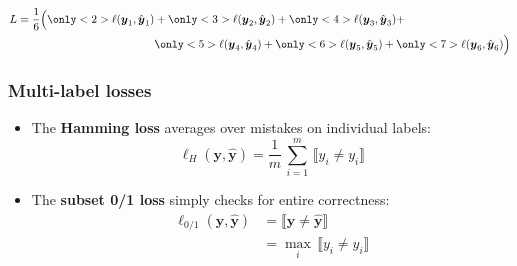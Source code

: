\documentclass[]{beamer}
\renewcommand{\vec}[1]{\boldsymbol{#1}}
\newcommand{\ellrank}{\ell_{\textnormal{\scriptsize{rnk}}}}
\newcommand{\by}{\boldsymbol{y}}
\newcommand{\bh}{\boldsymbol{h}}
\newcommand{\assert}[1]{\llbracket #1 \rrbracket}
\renewcommand{\emph}[1]{\textbf{\color{putblue}#1}}
\begin{document}
\begin{frame}
\begin{align*}
L = \frac{1}{6} \Big( {\only<2>{\color{putred}}\ell(\vec{y}_1,\hat{\vec{y}}_1)}  & + 
{\only<3>{\color{putred}}\ell(\vec{y}_2,\hat{\vec{y}}_2)} +
{\only<4>{\color{putred}}\ell(\vec{y}_3,\hat{\vec{y}}_3)} + \\
& {\only<5>{\color{putred}}\ell(\vec{y}_4,\hat{\vec{y}}_4)} +
{\only<6>{\color{putred}}\ell(\vec{y}_5,\hat{\vec{y}}_5)} +
{\only<7>{\color{putred}}\ell(\vec{y}_6,\hat{\vec{y}}_6)} 
\Big)
\end{align*}

\end{frame}



\begin{frame}
\frametitle{Multi-label losses}
\begin{itemize}
\item The \emph{Hamming loss} averages over mistakes on individual labels:    
$$
\displaystyle \ell_H(\by, \hat{\by}) = \frac{1}{m}  \, \sum_{i=1}^m \, \assert{y_i \neq  y_i}
$$

\item The \emph{subset 0/1 loss} simply checks for entire correctness:  
\begin{align*}
\displaystyle \ell_{0/1}(\by, \hat{\by}) & = \assert{\by \ne \hat{\by}} \\
& =  \max_i \, \assert{y_i \neq  y_i}
\end{align*}

\end{itemize}
\end{frame}
\end{document}
